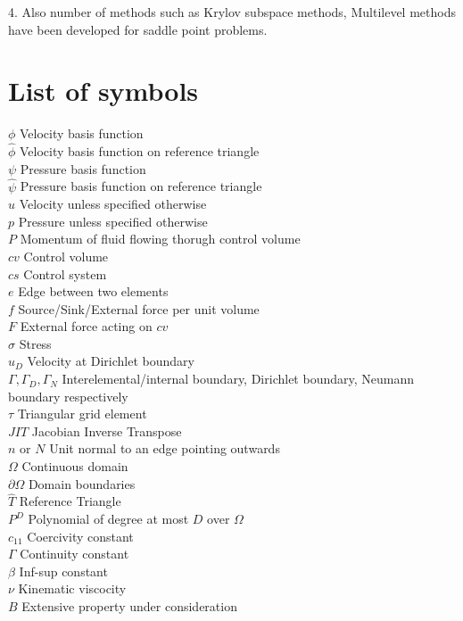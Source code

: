 \documentclass[a4paper,12pt]{book}
\begin{document}
4. Also number of methods such as Krylov subspace methods, Multilevel methods have been developed for saddle point problems.\\

\section{List of symbols} \label{symbol_list}

$\phi$ Velocity basis function\\
$\hat{\phi}$ Velocity basis function on reference triangle\\
$\psi$ Pressure basis function\\
$\hat{\psi}$ Pressure basis function on reference triangle\\
$u$ Velocity unless specified otherwise\\
$p$ Pressure unless specified otherwise\\
$P$ Momentum of fluid flowing thorugh control volume\\
$cv$ Control volume\\
$cs$ Control system\\
$e$ Edge between two elements\\ 
$f$ Source/Sink/External force per unit volume\\
$F$ External force acting on $cv$\\
$\sigma$ Stress\\
$u_D$ Velocity at Dirichlet boundary\\
$\Gamma, \Gamma_D, \Gamma_N$ Interelemental/internal boundary, Dirichlet boundary, Neumann boundary respectively\\
$\tau$ Triangular grid element\\
$JIT$ Jacobian Inverse Transpose\\
$n$ or $N$ Unit normal to an edge pointing outwards\\
$\Omega$ Continuous domain\\
$\partial \Omega$ Domain boundaries\\
$\hat{T}$ Reference Triangle\\
$P^D$ Polynomial of degree at most $D$ over $\Omega$\\
$c_{11}$ Coercivity constant\\
$\Gamma$ Continuity constant\\
$\beta$ Inf-sup constant\\
$\nu$ Kinematic viscocity\\
$B$ Extensive property under consideration  \\
\end{document}
